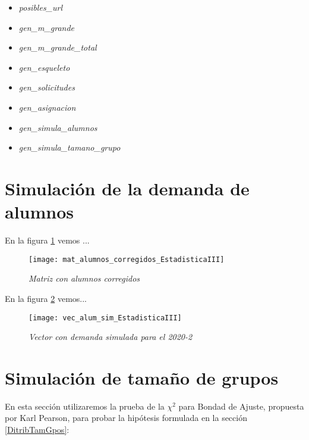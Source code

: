 \begin{itemize}
\item \textit{posibles\_url}

\item \textit{gen\_m\_grande}

\item \textit{gen\_m\_grande\_total}

\item \textit{gen\_esqueleto}

\item \textit{gen\_solicitudes}

\item \textit{gen\_asignacion}

\item \textit{gen\_simula\_alumnos}

\item \textit{gen\_simula\_tamano\_grupo}
\end{itemize}


\section{Simulación de la demanda de alumnos}

En la figura \ref{matAl_corregidos} vemos ...

\begin{figure}[H]
\centering
\texttt{[image: mat\_alumnos\_corregidos\_EstadisticaIII]} %
\caption{\textit{Matriz con alumnos corregidos}}\label{matAl_corregidos}
\end{figure}

En la figura \ref{vec_alum_sim} vemos...

\begin{figure}[H]
\centering
\texttt{[image: vec\_alum\_sim\_EstadisticaIII]} %
\caption{\textit{Vector con demanda simulada para el 2020-2}}\label{vec_alum_sim}
\end{figure}



\section{Simulación de tamaño de grupos} \label{SimTamGpos}

En esta sección utilizaremos la prueba de la $\chi^{2}$ para Bondad de Ajuste, propuesta por Karl Pearson, para probar la hipótesis formulada en la sección \ref{DitribTamGpos}: 

